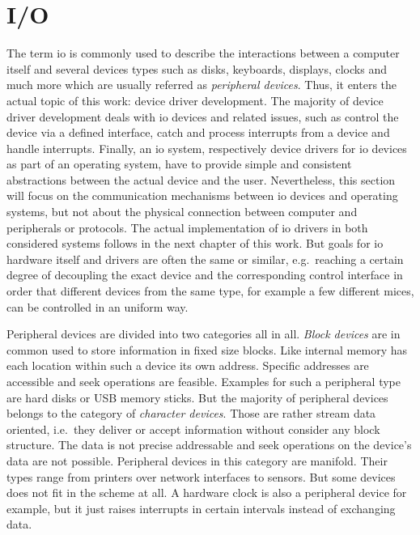 \section{I/O}\label{sec:io} 
The term \acf{io} is commonly used to describe the interactions between a computer itself and several devices types such as disks, keyboards, displays, clocks and much more which are usually referred as \textit{peripheral devices}.
Thus, it enters the actual topic of this work: device driver development.
The majority of device driver development deals with \ac{io} devices and related issues, such as control the device via a defined interface, catch and process interrupts from a device and handle interrupts.
Finally, an \ac{io} system, respectively device drivers for \ac{io} devices as part of an operating system, have to provide simple and consistent abstractions between the actual device and the user\cite{tanenbaum-modern-operating-systems}.
Nevertheless, this section will focus on the communication mechanisms between \ac{io} devices and operating systems, but not about the physical connection between computer and peripherals or protocols.
The actual implementation of \ac{io} drivers in both considered systems follows in the next chapter of this work.
But goals for \ac{io} hardware itself and drivers are often the same or similar, e.g.\ reaching a certain degree of decoupling the exact device and the corresponding control interface in order that different devices from the same type, for example a few different mices, can be controlled in an uniform way\cite{tanenbaum-modern-operating-systems}.

Peripheral devices are divided into two categories all in all.
\textit{Block devices} are in common used to store information in fixed size blocks.
Like internal memory has each location within such a device its own address.
Specific addresses are accessible and seek operations are feasible.
Examples for such a peripheral type are hard disks or USB memory sticks\cite{tanenbaum-modern-operating-systems}.
But the majority of peripheral devices belongs to the category of \textit{character devices}.
Those are rather stream data oriented, i.e.\ they deliver or accept information without consider any block structure.
The data is not precise addressable and seek operations on the device's data are not possible.
Peripheral devices in this category are manifold.
Their types range from printers over network interfaces to sensors\cite{tanenbaum-modern-operating-systems}.
But some devices does not fit in the scheme at all.
A hardware clock is also a peripheral device for example, but it just raises interrupts in certain intervals instead of exchanging data.

